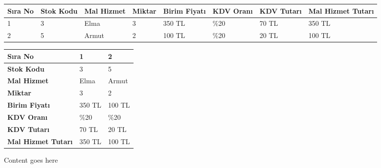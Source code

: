 \noindent\begin{tabularx}{\textwidth}{|p{1cm}|X|X|p{1.5cm}|X|p{2cm}|X|X|}\hline 
 \textbf{Sıra No} & \textbf{Stok Kodu} & \textbf{Mal Hizmet} & \textbf{Miktar} & \textbf{Birim Fiyatı} & \textbf{KDV Oranı} & \textbf{KDV Tutarı} & \textbf{Mal Hizmet Tutarı}\\ \hline
 1 & 3 & Elma & 3 & 350 TL & \%20 & 70 TL & 350 TL \\ \hline
 2 & 5 & Armut & 2 & 100 TL & \%20 & 20 TL & 100 TL \\ \hline
 \end{tabularx}

\vspace{0.2cm}
\begin{minipage}[t]{0.48\textwidth}\end{minipage}\hfill\noindent\begin{minipage}[t]{0.48\textwidth}\begin{tabularx}{\textwidth}{|l|X|X|}\hline 
\textbf{Sıra No} & 1 & 2 \\ \hline 
\textbf{Stok Kodu} & 3 & 5 \\ \hline 
\textbf{Mal Hizmet} & Elma & Armut \\ \hline 
\textbf{Miktar} & 3 & 2 \\ \hline 
\textbf{Birim Fiyatı} & 350 TL & 100 TL \\ \hline 
\textbf{KDV Oranı} & \%20 & \%20 \\ \hline 
\textbf{KDV Tutarı} & 70 TL & 20 TL \\ \hline 
\textbf{Mal Hizmet Tutarı} & 350 TL & 100 TL \\ \hline 
\end{tabularx}
\end{minipage}
\vspace{0.2cm}
\begin{tcolorbox}[colframe=black, colback=white, boxrule=0.8mm, sharp corners, height=4cm, width=\textwidth]Content goes here\end{tcolorbox}
